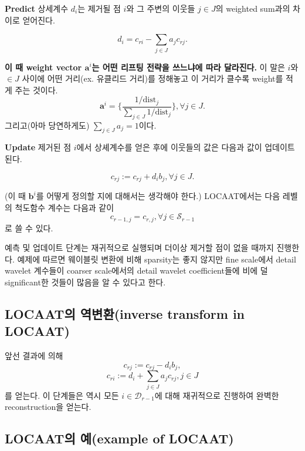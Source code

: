 \documentclass[b5paper,]{book}
\theoremstyle{definition}
\theoremstyle{definition}
\theoremstyle{definition}
\theoremstyle{remark}
\begin{document}
\textbf{Predict} 상세계수 \(d_{i}\)는 제거될 점 \(i\)와 그 주변의 이웃들
\(j\in J\)의 weighted sum과의 차이로 얻어진다.

\begin{equation}\label{eq:LOCAATforwardpre}
d_{i}=c_{ri}-\sum_{j\in J}a_{j}c_{rj}.
\end{equation}

\textbf{이 때 weight vector \(\mathbf{a}^{i}\)는 어떤 리프팅 전략을
쓰느냐에 따라 달라진다.} 이 말은 \(i\)와 \(\in J\) 사이에 어떤 거리(ex.
유클리드 거리)를 정해놓고 이 거리가 클수록 weight를 적게 주는 것이다.
\[\mathbf{a}^{i}=\{ \frac{1/\text{dist}_{j}}{\sum_{j\in J}1/\text{dist}_{j}}\}, \forall j\in J.\]
그리고(아마 당연하게도) \(\sum_{j\in J} a_{j}=1\)이다.

\textbf{Update} 제거된 점 \(i\)에서 상셰계수를 얻은 후에 이웃들의 값은
다음과 값이 업데이트된다.

\begin{equation}\label{eq:LOCAATforwardup}
c_{rj}:=c_{rj}+d_{i}b_{j},\forall j\in J.
\end{equation}

(이 때 \(\mathbf{b}^{i}\)를 어떻게 정의할 지에 대해서는 생각해야 한다.)
LOCAAT에서는 다음 레벨의 척도함수 계수는 다음과 같이
\[c_{r-1,j}=c_{r,j},\forall j \in \mathcal{S}_{r-1}\] 로 쓸 수 있다.

예측 및 업데이트 단계는 재귀적으로 실행되며 더이상 제거할 점이 없을
때까지 진행한다. 예제에 따르면 웨이블릿 변환에 비해 sparsity는 좋지
않지만 fine scale에서 detail wavelet 계수들이 coarser scale에서의 detail
wavelet coefficient들에 비에 덜 significant한 것들이 많음을 알 수 있다고
한다.

\subsection{LOCAAT의 역변환(inverse transform in
LOCAAT)}\label{locaat-inverse-transform-in-locaat}

앞선 결과에 의해 \[c_{rj}:=c_{rj}-d_{i}b_{j},\]
\[c_{ri}:=d_{i}+\sum_{j\in J}a_{j}c_{rj}, j\in J\] 를 얻는다. 이
단계들은 역시 모든 \(i\in\mathcal{D}_{r-1}\)에 대해 재귀적으로 진행하여
완벽한 reconstruction을 얻는다.

\subsection{LOCAAT의 예(example of
LOCAAT)}\label{locaat-example-of-locaat}
\end{document}
